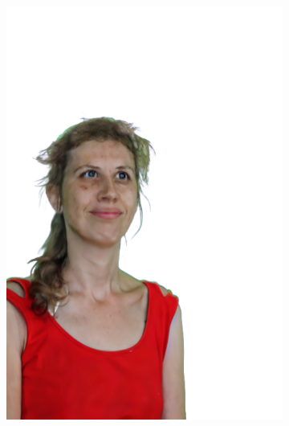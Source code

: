 \begin{figure}[ht]
    \centering
	\begin{subfigure}{0.08\linewidth}%
        \includegraphics[width=\textwidth]{Figures/results/high/dora_rabbit/11_render.png}

\end{subfigure}
\end{figure}
